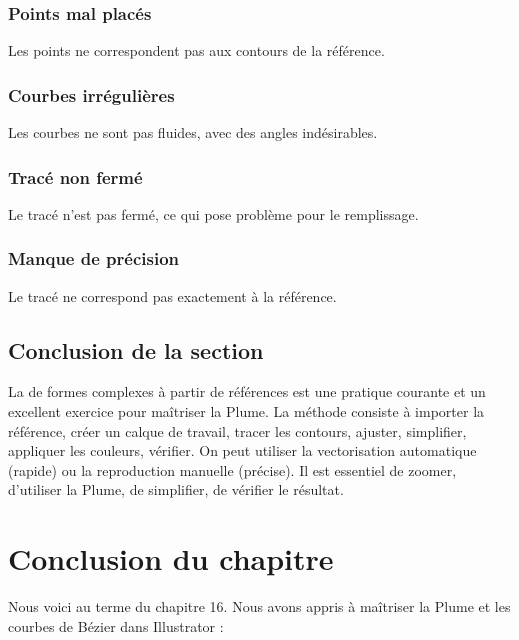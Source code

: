 \subsubsection{Points mal placés}

Les points ne correspondent pas aux contours de la référence.

\subsubsection{Courbes irrégulières}

Les courbes ne sont pas fluides, avec des angles indésirables.

\subsubsection{Tracé non fermé}

Le tracé n'est pas fermé, ce qui pose problème pour le remplissage.

\subsubsection{Manque de précision}

Le tracé ne correspond pas exactement à la référence.

\subsection*{Conclusion de la section}

La  de formes complexes à partir de références est une pratique courante et un excellent exercice pour maîtriser la Plume. La méthode consiste à importer la référence, créer un calque de travail, tracer les contours, ajuster, simplifier, appliquer les couleurs, vérifier. On peut utiliser la vectorisation automatique (rapide) ou la reproduction manuelle (précise). Il est essentiel de zoomer, d'utiliser la Plume, de simplifier, de vérifier le résultat.

\section*{Conclusion du chapitre}

Nous voici au terme du chapitre 16. Nous avons appris à maîtriser la Plume et les courbes de Bézier dans Illustrator :

